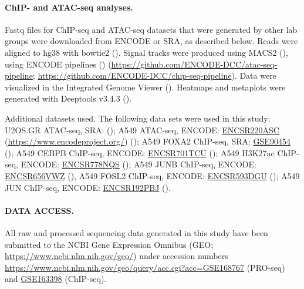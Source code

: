 \documentclass{article}
\begin{document}
{\paragraph{ChIP- and ATAC-seq analyses.} Fastq files for ChIP-seq and ATAC-seq datasets that were generated by other lab groups were downloaded from ENCODE or SRA, as described below. Reads were aligned to hg38 with bowtie2 (\cite{langmead_fast_2012}). Signal tracks were produced using MACS2 (\cite{zhang_model-based_2008}), using ENCODE pipelines (\cite{moore_expanded_2020}) (\url{https://github.com/ENCODE-DCC/atac-seq-pipeline}; \url{https://github.com/ENCODE-DCC/chip-seq-pipeline}). Data were visualized in the Integrated Genome Viewer (\cite{robinson_integrative_2011}). Heatmaps and metaplots were generated with Deeptools v3.4.3 (\cite{ramirez_deeptools2_2016}).

Additional datasets used. The following data sets were used in this study: U2OS.GR ATAC-seq, SRA: \href{https://www.ncbi.nlm.nih.gov/geo/query/acc.cgi?acc=GSE109589} (\cite{lee_different_2018}); A549 ATAC-seq, ENCODE: \href{https://www.encodeproject.org/experiments/ENCSR220ASC/}{ENCSR220ASC} (\url{https://www.encodeproject.org/}) (\cite{encode_project_consortium_integrated_2012, davis_encyclopedia_2018}); A549 FOXA2 ChIP-seq, SRA: \href{https://www.ncbi.nlm.nih.gov/geo/query/acc.cgi?acc=GSE90454}{GSE90454} (\cite{donaghey_genetic_2018}); A549 CEBPB ChIP-seq, ENCODE: \href{https://www.encodeproject.org/experiments/ENCSR701TCU/}{ENCSR701TCU}  (\cite{mcdowell_glucocorticoid_2018}); A549 H3K27ac ChIP-seq, ENCODE: \href{https://www.encodeproject.org/experiments/ENCSR778NQS/}{ENCSR778NQS} (\cite{mcdowell_glucocorticoid_2018}); A549 JUNB ChIP-seq, ENCODE: \href{https://www.encodeproject.org/experiments/ENCSR656VWZ/}{ENCSR656VWZ} (\cite{mcdowell_glucocorticoid_2018}), A549 FOSL2 ChIP-seq, ENCODE: \href{https://www.encodeproject.org/experiments/ENCSR593DGU/}{ENCSR593DGU} (\cite{mcdowell_glucocorticoid_2018}); A549 JUN ChIP-seq, ENCODE: \href{https://www.encodeproject.org/experiments/ENCSR192PBJ/}{ENCSR192PBJ} (\cite{mcdowell_glucocorticoid_2018}).

\paragraph{DATA ACCESS.} All raw and processed sequencing data generated in this study have been submitted to the NCBI Gene Expression Omnibus (GEO; \url{https://www.ncbi.nlm.nih.gov/geo/}) under accession numbers \href{GSE168767}{https://www.ncbi.nlm.nih.gov/geo/query/acc.cgi?acc=GSE168767} (PRO-seq) and \href{https://www.ncbi.nlm.nih.gov/geo/query/acc.cgi?acc=GSE163398}{GSE163398} (ChIP-seq).

}
\end{document}
